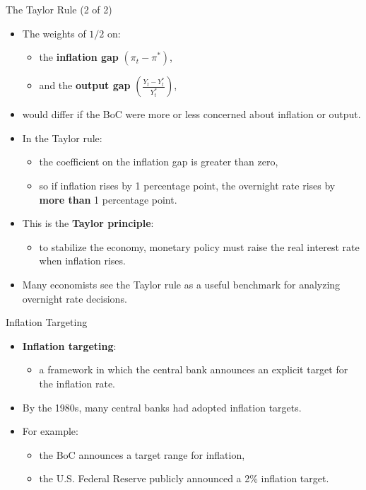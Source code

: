 \documentclass[aspectratio=169]{beamer}
\begin{document}
\begin{frame}{The Taylor Rule (2 of 2)}
\transfade
\begin{itemize}[<+->]
  \item The weights of \(1/2\) on:
  \begin{itemize}[<+->]
    \item the \textbf{inflation gap} \((\pi_{t} - \pi^{*})\),
    \item and the \textbf{output gap} \(\left( \frac{Y_{t} - Y^{*}_{t}}{Y^{*}_{t}} \right)\),
  \end{itemize}
  \item would differ if the BoC were more or less concerned about inflation or output.
  \item In the Taylor rule:
  \begin{itemize}[<+->]
    \item the coefficient on the inflation gap is greater than zero,
    \item so if inflation rises by 1 percentage point, the overnight rate rises by \textbf{more than} 1 percentage point.
  \end{itemize}
  \item This is the \textbf{Taylor principle}:
  \begin{itemize}[<+->]
    \item to stabilize the economy, monetary policy must raise the real interest rate when inflation rises.
  \end{itemize}
  \item Many economists see the Taylor rule as a useful \alert{benchmark} for analyzing overnight rate decisions.
\end{itemize}
\end{frame}

\begin{frame}{Inflation Targeting}
\transfade
\begin{itemize}[<+->]
  \item \textbf{Inflation targeting}:
  \begin{itemize}[<+->]
    \item a framework in which the central bank announces an explicit target for the inflation rate.
  \end{itemize}
  \item By the 1980s, many central banks had adopted inflation targets.
  \item For example:
  \begin{itemize}[<+->]
    \item the BoC announces a target range for inflation,
    \item the U.S. Federal Reserve publicly announced a 2\% inflation target.
  \end{itemize}
\end{itemize}
\end{frame}
\end{document}
